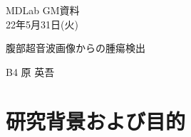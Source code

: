 \documentclass[a4j]{ujarticle}
\begin{document}
    \begin{flushright}
        MDLab GM資料\\
        22年5月31日(火)
    \end{flushright}

    \begin{center}
        {\Large	腹部超音波画像からの腫瘍検出}
    \end{center}

    \begin{flushright}
        {\large B4 原 英吾}\\
    \end{flushright}

    \section{研究背景および目的}
\end{document}
